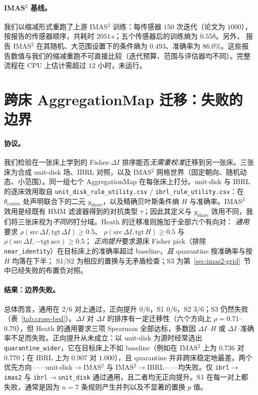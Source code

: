 \documentclass[11pt,a4paper]{article}
\begin{document}
\paragraph{IMAS$^2$ 基线。}
我们以缩减形式重跑了上游 IMAS$^2$ 训练：每传感器 $150$ 次迭代（论文为 $1000$），按报告的传感器顺序，共耗时 $2051$\,s；五个传感器后的训练熵为 $0.558$。另外，\citet{shi2026imas2} 报告 IMAS$^2$ 在其随机、大范围设置下的条件熵为 $0.493$、准确率为 $86.0\%$。这些报告数值与我们的缩减重跑不可直接比较（迭代预算、范围与评估器均不同）。完整流程在 CPU 上估计需超过 $12$ 小时，未运行。

\section{跨床 AggregationMap 迁移：失败的边界}
\label{sec:cross-bed}

\paragraph{协议。}
我们检验在一张床上学到的 Fisher-$\Delta I$ 排序能否\emph{无需重校准}迁移到另一张床。三张床为合成 unit-disk 场、IBRL 对照，以及 IMAS$^2$ 网格世界（固定朝向、随机动态、小范围）。同一组七个 AggregationMap 在每张床上打分。unit-disk 与 IBRL 的逐床效用取自
\texttt{unit\_disk\_rule\_utility.csv} /
\texttt{ibrl\_rule\_utility.csv}：在 $\theta_{\mathrm{centre}}$ 处声明联合下的二元 $y_{\mathrm{share}}$，以及精确贝叶斯条件熵 $H$ 与准确率。IMAS$^2$ 效用是经既有 HMM 滤波器得到的对抗类型 $\tau$；因此其定义与 $y_{\mathrm{share}}$ 效用不同，我们将三张床视为\emph{不同的}打分域。Heath 的迁移准则施加于全部六个有向对：
\emph{通用}要求
$\rho(\mathrm{src}\,\Delta I,\mathrm{tgt}\,\Delta I)\ge 0.5$、
$\rho(\mathrm{src}\,\Delta I,\mathrm{tgt}\,H)\ge 0.5$ 与
$\rho(\mathrm{src}\,\Delta I,-\mathrm{tgt}\,\mathrm{acc})\ge 0.5$；
\emph{正向提升}要求源床 Fisher pick（排除 \texttt{near\_identity}）在目标床上的准确率超过 baseline，\emph{且} quarantine 按准确率与按 $H$ 均落在下半；
S1/S2 为相应的置换与无矛盾检查；S3 为第~\ref{sec:imas2-grid}~节中已经失败的布置负对照。

\paragraph{结果：边界失败。}
总体而言，通用在 $2/6$ 对上通过，正向提升 $0/6$，S1 $0/6$，S2 $3/6$；S3 仍然失败（表~\ref{tab:cross-bed}）。$\Delta I$ 对 $\Delta I$ 的排序有一定迁移性（六个方向上 $\rho=0.71$--$0.79$），但 Heath 的通用要求三项 Spearman 全部达标，多数因 $\Delta I$--$H$ 或 $\Delta I$--准确率不足而失败。正向提升从未成立：以 unit-disk 为源时经常选出 \texttt{quarantine\_wider}，它在目标床上不如 baseline（例如在 IMAS$^2$ 上为 $0.736$ 对 $0.770$；在 IBRL 上为 $0.907$ 对 $1.000$），且 quarantine 并非跨床稳定地最差。两个优先方向——unit-disk$\to$IMAS$^2$ 与 IMAS$^2\to$IBRL——均失败。仅 \texttt{ibrl}$\to$\texttt{imas2} 与 \texttt{ibrl}$\to$\texttt{unit\_disk} 通过通用，且二者均无正向提升。S1 在每一对上都失败，通常是因为 $n=7$ 条规则产生并列以及不显著的置换 $p$ 值。
\end{document}
